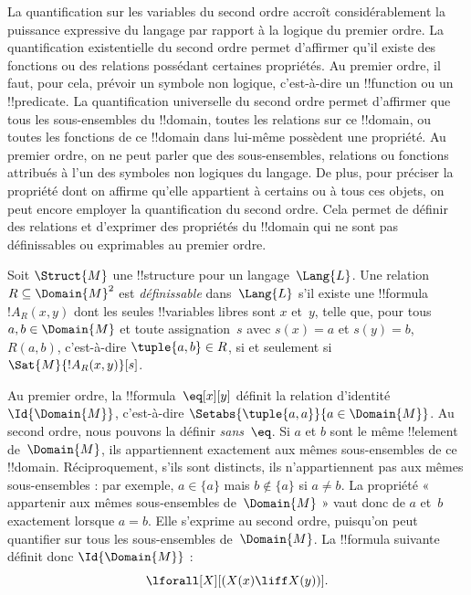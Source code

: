 \documentclass[../../../include/open-logic-section]{subfiles}
\begin{document}

\begin{explain}
La quantification sur les variables du second ordre
accroît considérablement la puissance expressive
du langage par rapport à la logique du premier
ordre. La quantification existentielle du second
ordre permet d'affirmer qu'il existe des fonctions
ou des relations possédant certaines propriétés.
Au premier ordre, il faut, pour cela, prévoir un
symbole non logique, c'est-à-dire un
!!{function} ou un !!{predicate}. La quantification
universelle du second ordre permet d'affirmer que
tous les sous-ensembles du !!{domain}, toutes les
relations sur ce !!{domain}, ou toutes les fonctions
de ce !!{domain} dans lui-même possèdent une
propriété. Au premier ordre, on ne peut parler que
des sous-ensembles, relations ou fonctions attribués
à l'un des symboles non logiques du langage.
De plus, pour préciser la propriété dont on affirme
qu'elle appartient à certains ou à tous ces objets,
on peut encore employer la quantification du second
ordre. Cela permet de définir des relations et
d'exprimer des propriétés du !!{domain} qui ne sont
pas définissables ou exprimables au premier ordre.
\end{explain}

\begin{defn}
Soit $\Struct{M}$ une !!{structure} pour un
langage~$\Lang{L}$. Une relation
$R\subseteq\Domain{M}^2$ est
\emph{définissable} dans~$\Lang{L}$ s'il existe
une !!{formula}~$!A_R(x,y)$ dont les seules
!!{variable}s libres sont $x$ et~$y$, telle que,
pour tous $a,b\in\Domain{M}$ et toute
assignation~$s$ avec $s(x)=a$ et $s(y)=b$,
$R(a,b)$, c'est-à-dire $\tuple{a,b}\in R$,
si et seulement si $\Sat{M}{!A_R(x,y)}[s]$.
\end{defn}

\begin{ex}
Au premier ordre, la !!{formula}~$\eq[x][y]$
définit la relation d'identité
$\Id{\Domain{M}}$, c'est-à-dire
$\Setabs{\tuple{a,a}}{a\in\Domain{M}}$.
Au second ordre, nous pouvons la définir
\emph{sans~$\eq$}. Si $a$ et $b$ sont le même
!!{element} de~$\Domain{M}$, ils appartiennent
exactement aux mêmes sous-ensembles de ce
!!{domain}. Réciproquement, s'ils sont distincts,
ils n'appartiennent pas aux mêmes sous-ensembles :
par exemple, $a\in\{a\}$ mais $b\notin\{a\}$
si $a\neq b$. La propriété « appartenir aux
mêmes sous-ensembles de~$\Domain{M}$ » vaut donc
de $a$ et~$b$ exactement lorsque $a=b$.
Elle s'exprime au second ordre, puisqu'on peut
quantifier sur tous les sous-ensembles
de~$\Domain{M}$. La !!{formula} suivante définit
donc $\Id{\Domain{M}}$ :
\[
\lforall[X][(X(x)\liff X(y))].
\]
\end{ex}
\end{document}
